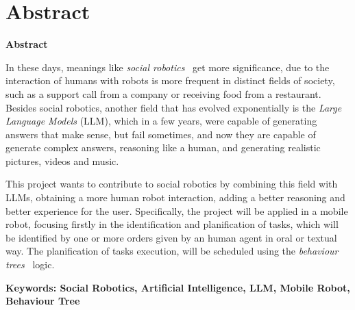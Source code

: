 \documentclass[../main.tex]{subfiles}
\begin{document}
\makeatletter
\renewenvironment{abstract}{%
    \if@twocolumn
      \section*{Abstract \\}%
    \else %
    \begin{flushright}
        {\filleft\Huge\bfseries\fontsize{48pt}{12}\selectfont Abstract\vspace{\z@}}%
        \end{flushright}
      \quotation
    \fi}
    {\if@twocolumn\else\endquotation\fi}
\makeatother
\begin{abstract}

In these days, meanings like \textit{social robotics}~\cite{canete2024multimodal} get more significance, due to the interaction of humans with robots is more frequent in distinct fields of society, such as a support call from a company or receiving food from a restaurant. Besides social robotics, another field that has evolved exponentially is the \textit{Large Language Models} (LLM), which in a few years, were capable of generating answers that make sense, but fail sometimes, and now they are capable of generate complex answers, reasoning like a human, and generating realistic pictures, videos and music.

This project wants to contribute to social robotics by combining this field with LLMs, obtaining a more human robot interaction, adding a better reasoning and better experience for the user. Specifically, the project will be applied in a mobile robot, focusing firstly in the identification and planification of tasks, which will be identified by one or more orders given by an human agent in oral or textual way. The planification of tasks execution, will be scheduled using the \textit{behaviour trees}~\cite{ogren2022behavior} logic.

\bfseries{\large{Keywords:}} Social Robotics, Artificial Intelligence, LLM, Mobile Robot, Behaviour Tree

\end{abstract}
\end{document}
